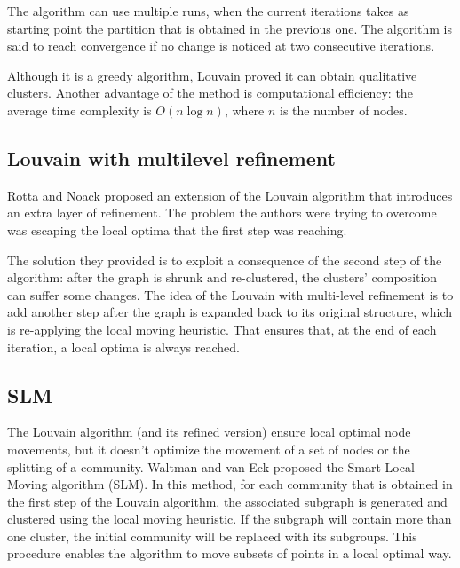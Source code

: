 The algorithm can use multiple runs, when the current iterations takes as starting point the partition that is obtained in the previous one. The algorithm is said to reach convergence if no change is noticed at two consecutive iterations.

Although it is a greedy algorithm, Louvain proved it can obtain qualitative clusters. Another advantage of the method is computational efficiency: the average time complexity is $O(n \log n)$, where $n$ is the number of nodes.


\subsection{Louvain with multilevel refinement}
Rotta and Noack \cite{Rotta2011} proposed an extension of the Louvain algorithm that introduces an extra layer of refinement. The problem the authors were trying to overcome was escaping the local optima that the first step was reaching. 

The solution they provided is to exploit a consequence of the second step of the algorithm: after the graph is shrunk and re-clustered, the clusters' composition can suffer some changes. The idea of the Louvain with multi-level refinement is to add another step after the graph is expanded back to its original structure, which is re-applying the local moving heuristic. That ensures that, at the end of each iteration, a local optima is always reached.

\subsection{SLM}
The Louvain algorithm (and its refined version) ensure local optimal node movements, but it doesn't optimize the movement of a set of nodes or the splitting of a community. Waltman and van Eck \cite{Waltman2013} proposed the Smart Local Moving algorithm (SLM). In this method, for each community that is obtained in the first step of the Louvain algorithm, the associated subgraph is generated and clustered using the local moving heuristic. If the subgraph will contain more than one cluster, the initial community will be replaced with its subgroups. This procedure enables the algorithm to move subsets of points in a local optimal way. 

